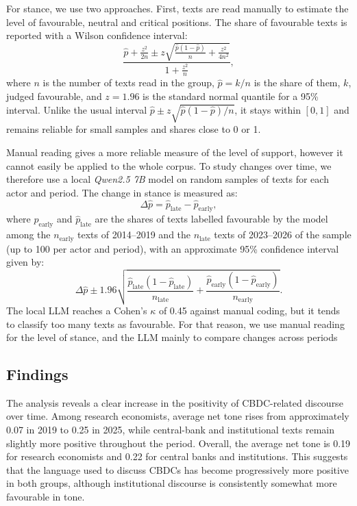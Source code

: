 \documentclass[11pt,a4paper]{article}
\begin{document}
For stance, we use two approaches. First, texts are read manually to estimate the level of favourable, neutral 
and critical positions. The share of favourable texts is reported with a Wilson confidence interval:
\begin{equation}\label{eq:wilson}
\frac{
\hat{p} + \frac{z^2}{2n}
\pm
z \sqrt{
\frac{\hat{p}(1-\hat{p})}{n}
+
\frac{z^2}{4n^2}
}
}{
1+\frac{z^2}{n}
},
\end{equation}
where $n$ is the number of texts read in the group, $\hat p = k/n$ is the share of them, $k$, judged favourable, and 
$z = 1.96$ is the standard normal quantile for a 95\% interval. Unlike the usual interval $\hat p \pm z\sqrt{\hat p(1-\hat p)/n}$, 
it stays within $[0, 1]$ and remains reliable for small samples and shares close to 0 or 1.

Manual reading gives a more reliable measure of the level of support, however it cannot easily be applied to 
the whole corpus. To study changes over time, we therefore use a local \textit{Qwen2.5 7B} model on random 
samples of texts for each actor and period. The change in stance is measured as:
\begin{equation}\label{eq:dstance}
\Delta \hat{p} = \hat{p}_{\text{late}} - \hat{p}_{\text{early}},
\end{equation}
where $\hat p_{\text{early}}$ and $\hat p_{\text{late}}$ are the shares of texts labelled favourable by the model among the 
$n_{\text{early}}$ texts of 2014--2019 and the $n_{\text{late}}$ texts of 2023--2026 of the sample (up to 100 per actor and period), 
with an approximate 95\% confidence interval given by:
\begin{equation}\label{eq:dstance-ci}
\Delta \hat{p}
\pm
1.96
\sqrt{
\frac{\hat{p}_{\text{late}}\left(1-\hat{p}_{\text{late}}\right)}{n_{\text{late}}}
+
\frac{\hat{p}_{\text{early}}\left(1-\hat{p}_{\text{early}}\right)}{n_{\text{early}}}
}.
\end{equation}
The local LLM reaches a Cohen’s \(\kappa\) of 0.45 against manual coding, but it tends to classify too many texts as favourable. 
For that reason, we use manual reading for the level of stance, and the LLM mainly to compare changes across periods

\subsection{Findings}
The analysis reveals a clear increase in the positivity of CBDC-related discourse over time. Among research economists, average 
net tone rises from approximately 0.07 in 2019 to 0.25 in 2025, while central-bank and institutional texts remain slightly more 
positive throughout the period. Overall, the average net tone is 0.19 for research economists and 0.22 for central banks and 
institutions. This suggests that the language used to discuss CBDCs has become progressively more positive in both groups, 
although institutional discourse is consistently somewhat more favourable in tone.
\end{document}
